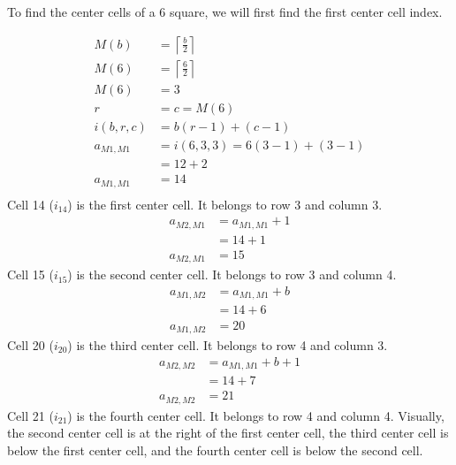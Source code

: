 \documentclass[twoside,openany,12pt]{book}
\begin{document}
    To find the center cells of a 6 square, we will first find the first center cell index.

    \begin{equation}
        \begin{split}
            M(b) &= \left\lceil \frac{b}{2} \right\rceil \\
            M(6) &= \left\lceil \frac{6}{2} \right\rceil \\
            M(6) &= 3 \\
            r &= c = M(6) \\
            i(b,r,c) &= b(r-1)+(c-1) \\
            a_{M1,M1} &= i(6,3,3) = 6(3-1)+(3-1) \\
                &= 12 + 2 \\
            a_{M1,M1} &= 14 \\
        \end{split}
    \end{equation}
    Cell 14 ($i_{14}$) is the first center cell. It belongs to row 3 and column 3.
    \begin{equation}
        \begin{split}
            a_{M2,M1} &= a_{M1,M1} + 1 \\
              &= 14 + 1 \\
            a_{M2,M1} &= 15 
        \end{split}
    \end{equation}
    Cell 15 ($i_{15}$) is the second center cell. It belongs to row 3 and column 4.
    \begin{equation}
        \begin{split}
            a_{M1,M2} &= a_{M1,M1} + b \\
              &= 14 + 6 \\
            a_{M1,M2} &= 20 
        \end{split}
    \end{equation}
    Cell 20 ($i_{20}$) is the third center cell. It belongs to row 4 and column 3.
    \begin{equation}
        \begin{split}
            a_{M2,M2} &= a_{M1,M1} + b + 1 \\
              &= 14 + 7 \\
            a_{M2,M2} &= 21 
        \end{split}
    \end{equation}
    Cell 21 ($i_{21}$) is the fourth center cell. It belongs to row 4 and column 4.
    \newpage
    Visually, the second center cell is at the right of the first center cell, the third center cell is below the first center cell, and the fourth center cell is below the second cell.
\end{document}
